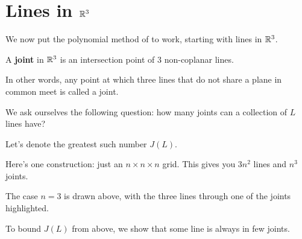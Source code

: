 \section{Lines in $\mathbb{R}^3$}

We now put the polynomial method of  to work, starting with lines in $\mathbb{R}^3$.

\begin{boxdefinition}[Joint]
    A \textbf{joint} in $\mathbb{R}^3$ is an intersection point of $3$ non-coplanar lines.
\end{boxdefinition}

In other words, any point at which three lines that do not share a plane in common meet is called a joint.

We ask ourselves the following question: how many joints can a collection of $L$ lines have?

Let's denote the greatest such number $J(L)$.

Here's one construction: just an $n \times n \times n$ grid. This gives you $3n^2$ lines and $n^3$ joints.

\begin{figure}[H]
    \centering
\end{figure}
The case $n = 3$ is drawn above, with the three lines through one of the joints highlighted.

To bound $J(L)$ from above, we show that some line is always in few joints.

